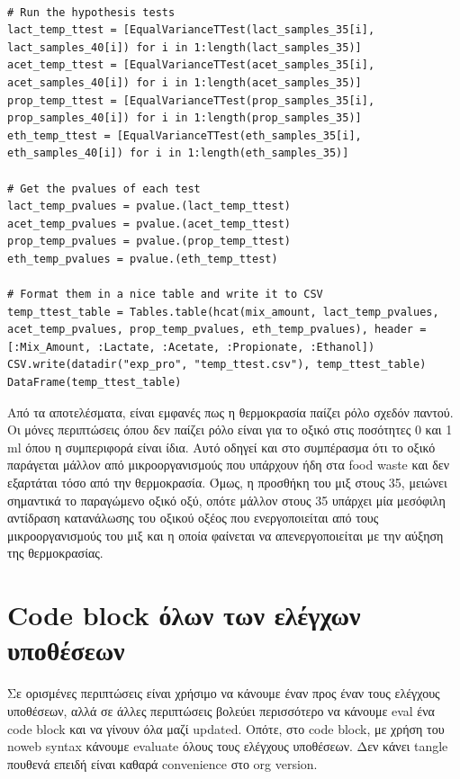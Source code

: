 \documentclass[11pt]{article}
\begin{document}
\begin{verbatim}

# Run the hypothesis tests
lact_temp_ttest = [EqualVarianceTTest(lact_samples_35[i], lact_samples_40[i]) for i in 1:length(lact_samples_35)]
acet_temp_ttest = [EqualVarianceTTest(acet_samples_35[i], acet_samples_40[i]) for i in 1:length(acet_samples_35)]
prop_temp_ttest = [EqualVarianceTTest(prop_samples_35[i], prop_samples_40[i]) for i in 1:length(prop_samples_35)]
eth_temp_ttest = [EqualVarianceTTest(eth_samples_35[i], eth_samples_40[i]) for i in 1:length(eth_samples_35)]

# Get the pvalues of each test
lact_temp_pvalues = pvalue.(lact_temp_ttest)
acet_temp_pvalues = pvalue.(acet_temp_ttest)
prop_temp_pvalues = pvalue.(prop_temp_ttest)
eth_temp_pvalues = pvalue.(eth_temp_ttest)

# Format them in a nice table and write it to CSV
temp_ttest_table = Tables.table(hcat(mix_amount, lact_temp_pvalues, acet_temp_pvalues, prop_temp_pvalues, eth_temp_pvalues), header = [:Mix_Amount, :Lactate, :Acetate, :Propionate, :Ethanol])
CSV.write(datadir("exp_pro", "temp_ttest.csv"), temp_ttest_table)
DataFrame(temp_ttest_table)
\end{verbatim}

Από τα αποτελέσματα, είναι εμφανές πως η θερμοκρασία παίζει ρόλο σχεδόν παντού. Οι μόνες περιπτώσεις όπου δεν παίζει ρόλο είναι για το οξικό στις ποσότητες 0 και 1 ml όπου η συμπεριφορά είναι ίδια. Αυτό οδηγεί και στο συμπέρασμα ότι το οξικό παράγεται μάλλον από μικροοργανισμούς που υπάρχουν ήδη στα food waste και δεν εξαρτάται τόσο από την θερμοκρασία. Όμως, η προσθήκη του μιξ στους 35, μειώνει σημαντικά το παραγώμενο οξικό οξύ, οπότε μάλλον στους 35 υπάρχει μία μεσόφιλη αντίδραση κατανάλωσης του οξικού οξέος που ενεργοποιείται από τους μικροοργανισμούς του μιξ και η οποία φαίνεται να απενεργοποιείται με την αύξηση της θερμοκρασίας.

\section{Code block όλων των ελέγχων υποθέσεων}
\label{sec:orge874475}
Σε ορισμένες περιπτώσεις είναι χρήσιμο να κάνουμε έναν προς έναν τους ελέγχους υποθέσεων, αλλά σε άλλες περιπτώσεις βολεύει περισσότερο να κάνουμε eval ένα code block και να γίνουν όλα μαζί updated. Οπότε, στο code block, με χρήση του noweb syntax κάνουμε evaluate όλους τους ελέγχους υποθέσεων. Δεν κάνει tangle πουθενά επειδή είναι καθαρά convenience στο org version.
\end{document}
